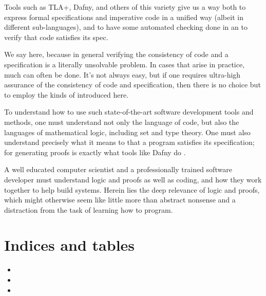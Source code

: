 \documentclass[letterpaper,10pt,english]{sphinxmanual}
\begin{document}
Tools such as TLA+, Dafny, and others of this variety give us a way
both to express formal specifications and imperative code in a unified
way (albeit in different sub-languages), and to have some automated
checking done in an  to verify that code satisfies its spec.

We say  here, because in general verifying the consistency of
code and a specification is a literally unsolvable problem. In cases
that arise in practice, much can often be done. It’s not always easy,
but if one requires ultra-high assurance of the consistency of code
and specification, then there is no choice but to employ the kinds of
 introduced here.

To understand how to use such state-of-the-art software development
tools and methods, one must understand not only the language of code,
but also the languages of mathematical logic, including set and type
theory. One must also understand precisely what it means to 
that a program satisfies its specification; for generating proofs is
exactly what tools like Dafny do .

A well educated computer scientist and a professionally trained
software developer must understand logic and proofs as well as coding,
and how they work together to help build  systems. Herein
lies the deep relevance of logic and proofs, which might otherwise
seem like little more than abstract nonsense and a distraction from
the task of learning how to program.


\chapter{Indices and tables}
\label{\detokenize{index:indices-and-tables}}\begin{itemize}
\item {} 

\item {} 

\item {} 

\end{itemize}



\renewcommand{\indexname}{Index}
\printindex
\end{document}
